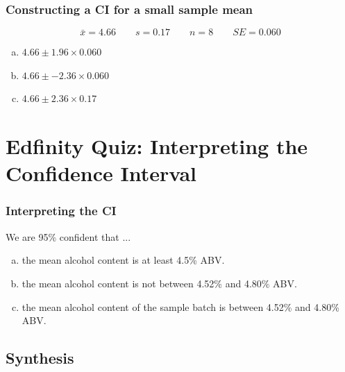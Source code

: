 \documentclass[slidestop,compress,mathserif]{beamer}
\newcommand{\soln}[1]{\textit{#1}}
\begin{document}
\begin{frame}
\frametitle{Constructing a CI for a small sample mean}

\[ \bar{x} = 4.66 \qquad s = 0.17 \qquad n = 8 \qquad SE = 0.060 \]

{
\begin{enumerate}[(a)]
\item $4.66 \pm 1.96 \times 0.060$
\item $4.66 \pm -2.36 \times 0.060$
\item $4.66 \pm 2.36 \times 0.17$
\end{enumerate}
}
{
\soln{}
\vspace{0.25cm}
}

\end{frame}


\section{Edfinity Quiz: Interpreting the Confidence Interval}



\begin{frame}
\frametitle{Interpreting the CI}


We are 95\% confident that ...

\begin{enumerate}[(a)]
\item the mean alcohol content is at least 4.5\% ABV.
\item the mean alcohol content is not between 4.52\% and 4.80\% ABV.
\item the mean alcohol content of the sample batch is between 4.52\% and 4.80\% ABV.
\end{enumerate}

\end{frame}


\subsection{Synthesis}
\end{document}
